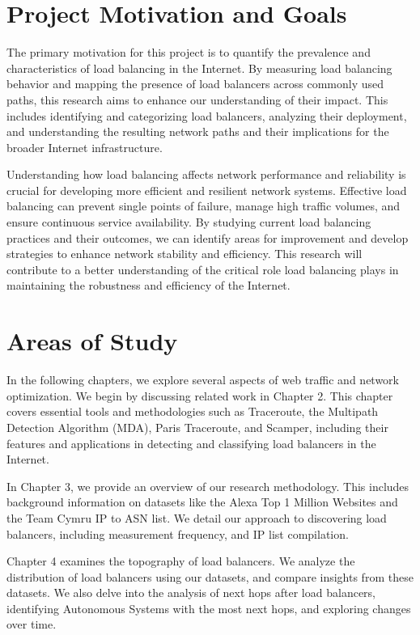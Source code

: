 \documentclass[12pt]{cwru_thesis}
\begin{document}
\section{Project Motivation and Goals}

The primary motivation for this project is to quantify the prevalence and characteristics of load balancing in the Internet. By measuring load balancing behavior and mapping the presence of load balancers across commonly used paths, this research aims to enhance our understanding of their impact. This includes identifying and categorizing load balancers, analyzing their deployment, and understanding the resulting network paths and their implications for the broader Internet infrastructure.

Understanding how load balancing affects network performance and reliability is crucial for developing more efficient and resilient network systems. Effective load balancing can prevent single points of failure, manage high traffic volumes, and ensure continuous service availability. By studying current load balancing practices and their outcomes, we can identify areas for improvement and develop strategies to enhance network stability and efficiency. This research will contribute to a better understanding of the critical role load balancing plays in maintaining the robustness and efficiency of the Internet.





\section{Areas of Study}

In the following chapters, we explore several aspects of web traffic and network optimization. We begin by discussing related work in Chapter 2. This chapter covers essential tools and methodologies such as Traceroute, the Multipath Detection Algorithm (MDA), Paris Traceroute, and Scamper, including their features and applications in detecting and classifying load balancers in the Internet.

In Chapter 3, we provide an overview of our research methodology. This includes background information on datasets like the Alexa Top 1 Million Websites and the Team Cymru IP to ASN list. We detail our approach to discovering load balancers, including measurement frequency, and IP list compilation.

Chapter 4 examines the topography of load balancers. We analyze the distribution of load balancers using our datasets, and compare insights from these datasets. We also delve into the analysis of next hops after load balancers, identifying Autonomous Systems with the most next hops, and exploring changes over time.
\end{document}
